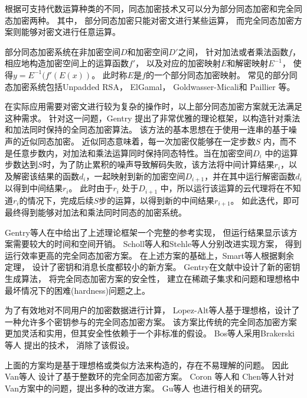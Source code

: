 根据可支持代数运算种类的不同，同态加密技术又可以分为部分同态加密和完全同态加密两种。
其中，
部分同态加密只能对密文进行某些运算，
而完全同态加密方案则能够对密文进行任意运算。

部分同态加密系统在非加密空间$D$和加密空间$D'$之间，
针对加法或者乘法函数$f$，相应地构造加密空间上的运算函数$f'$，
以及对应的加密映射$E$和解密映射${E^{-1}}$，
使得$y=E^{-1}(f'(E(x))$。
此时称$E$是$f$的一个部分同态加密映射。
常见的部分同态加密系统包括Unpadded RSA，
ElGamal， Goldwasser-Micali和
Paillier 等。

在实际应用需要对密文进行较为复杂的操作时，以上部分同态加密方案就无法满足这种需求。
针对这一问题，Gentry 提出了非常优雅的理论框架，以构造针对乘法和加法同时保持的全同态加密算法。
该方法的基本思想在于使用一连串的基于噪声的近似同态加密。
近似同态意味着，每一次加密仅能够在一定步数$S$ 内，而不是任意步数内，对加法和乘法运算同时保持同态特性。当在加密空间$D_i$ 中的运算步数达到$S$时，为了防止累积的噪声导致解码失败，该方法将中间计算结果$r_i$，以及解密该结果的函数$d_i$，一起映射到新的加密空间$D_{i+1}$，并在其中运行解密函数$d_i$以得到中间结果$r_i$。 
此时由于$r_i$ 处于$D_{i+1}$ 中，所以运行该运算的云代理将在不知道$r_i$的情况下，完成后续$S$步的运算，以得到新的中间结果$r_{i+1}$。 如此迭代，即可最终得到能够对加法和乘法同时同态的加密系统。

Gentry等人在中给出了上述理论框架一个完整的参考实现，
但运行结果显示该方案需要较大的时间和空间开销。
Scholl等人和Stehle等人分别改进实现方案，
得到运行效率更高的完全同态加密方案。
在上述方案的基础上，Smart等人根据剩余定理，
设计了密钥和消息长度都较小的新方案。
Gentry在文献中设计了新的密钥生成算法，
将完全同态加密方案的安全性，
建立在稀疏子集求和问题和理想格中最坏情况下的困难(hardness)问题之上。

为了有效地对不同用户的加密数据进行计算，
Lopez-Alt等人基于理想格，设计了一种允许多个密钥参与的完全同态加密方案。
该方案比传统的完全同态加密方案更加灵活和实用，但其安全性依赖于一个非标准的假设。
Bos等人采用Brakerski等人 提出的技术，
消除了该假设。

上面的方案均是基于理想格或类似方法来构造的，存在不易理解的问题。
因此Van等人 设计了基于整数环的完全同态加密方案。
Coron 等人和
Chen等人针对Van方案中的问题，提出多种的改进方案。
Gu等人 也进行相关的研究。

